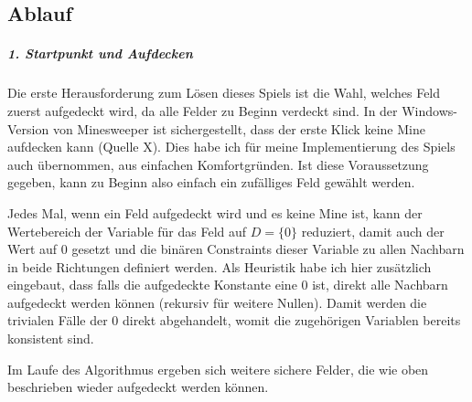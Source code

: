 \subsection*{Ablauf}
\subparagraph*{1. Startpunkt und Aufdecken}

Die erste Herausforderung zum Lösen dieses Spiels ist die Wahl, welches Feld zuerst aufgedeckt wird, da alle Felder zu Beginn verdeckt sind.
In der Windows-Version von Minesweeper ist sichergestellt, dass der erste Klick keine Mine aufdecken kann (Quelle X). Dies habe ich für 
meine Implementierung des Spiels auch übernommen, aus einfachen Komfortgründen. Ist diese Voraussetzung gegeben, kann zu Beginn also einfach
ein zufälliges Feld gewählt werden.

Jedes Mal, wenn ein Feld aufgedeckt wird und es keine Mine ist, kann der Wertebereich der Variable für
das Feld auf $D=\{0\}$ reduziert, damit auch der Wert auf 0 gesetzt und die binären Constraints dieser Variable zu allen Nachbarn in beide
Richtungen definiert werden. Als Heuristik habe ich hier zusätzlich eingebaut, dass falls die aufgedeckte Konstante eine 0 ist, direkt
alle Nachbarn aufgedeckt werden können (rekursiv für weitere Nullen). Damit werden die trivialen Fälle der 0 direkt abgehandelt, womit
die zugehörigen Variablen bereits konsistent sind.

Im Laufe des Algorithmus ergeben sich weitere sichere Felder, die wie oben beschrieben wieder aufgedeckt werden können.
